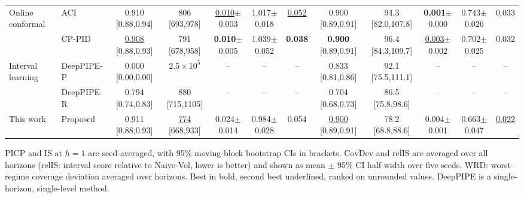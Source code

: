 \begin{table}[!t]
{\begin{tabular}{llcccccccccc}
\addlinespace[1pt]
Online conformal & ACI & 0.910 {\tiny[0.88,0.94]} & 806 {\tiny[693,978]} & \underline{0.010}{\tiny$\pm$0.003} & 1.017{\tiny$\pm$0.018} & \underline{0.052} & 0.900 {\tiny[0.89,0.91]} & 94.3 {\tiny[82.0,107.8]} & \textbf{0.001}{\tiny$\pm$0.000} & 0.743{\tiny$\pm$0.026} & 0.033\\
 & CP-PID & \underline{0.908} {\tiny[0.88,0.93]} & 791 {\tiny[678,958]} & \textbf{0.010}{\tiny$\pm$0.005} & 1.039{\tiny$\pm$0.052} & \textbf{0.038} & \textbf{0.900} {\tiny[0.89,0.91]} & 96.4 {\tiny[84.3,109.7]} & \underline{0.003}{\tiny$\pm$0.002} & 0.702{\tiny$\pm$0.025} & 0.032\\
\addlinespace[1pt]
Interval learning & DeepPIPE-P & 0.000 {\tiny[0.00,0.00]} & $2.5{\times}10^{5}$ & -- & -- & -- & 0.833 {\tiny[0.81,0.86]} & 92.1 {\tiny[75.5,111.1]} & -- & -- & --\\
 & DeepPIPE-R & 0.794 {\tiny[0.74,0.83]} & 880 {\tiny[715,1105]} & -- & -- & -- & 0.704 {\tiny[0.68,0.73]} & 86.5 {\tiny[75.8,98.6]} & -- & -- & --\\
\addlinespace[1pt]
This work & Proposed & 0.911 {\tiny[0.88,0.93]} & \underline{774} {\tiny[668,933]} & 0.024{\tiny$\pm$0.014} & 0.984{\tiny$\pm$0.028} & 0.054 & \underline{0.900} {\tiny[0.89,0.91]} & 78.2 {\tiny[68.8,88.6]} & 0.004{\tiny$\pm$0.001} & 0.663{\tiny$\pm$0.047} & \underline{0.022}\\
\bottomrule\end{tabular}}
\par\smallskip\parbox{\linewidth}{\scriptsize PICP and IS at $h=1$ are seed-averaged, with 95\% moving-block bootstrap CIs in brackets. $\overline{\mathrm{CovDev}}$ and $\overline{\mathrm{relIS}}$ are averaged over all horizons (relIS: interval score relative to Naive-Vol, lower is better) and shown as mean $\pm$ 95\% CI half-width over five seeds. WRD: worst-regime coverage deviation averaged over horizons. Best in bold, second best underlined, ranked on unrounded values. DeepPIPE is a single-horizon, single-level method.}
\end{table}